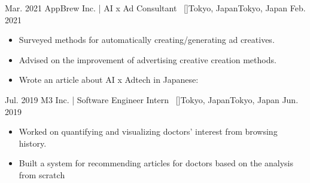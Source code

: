 \begin{experiences}
    \emptySeparator
    \researchexperience
    {Mar. 2021}   {AppBrew Inc. | AI x Ad Consultant{\normalfont  ~ [\href{https://appbrew.io/}{\small{\websiteSymbol}}]}}{Tokyo, Japan}{Tokyo, Japan}
    {Feb. 2021} {
    \begin{itemize}
        \item Surveyed methods for automatically creating/generating ad creatives.
        \item Advised on the improvement of advertising creative creation methods.
        \item Wrote an article about AI x Adtech in Japanese:
    \end{itemize}
    }


    \emptySeparator
    \researchexperience
    {Jul. 2019}   {M3 Inc. | Software Engineer Intern{\normalfont  ~ [\href{https://corporate.m3.com/en/}{\small{\websiteSymbol}}]}}{Tokyo, Japan}{Tokyo, Japan}
    {Jun. 2019} {
    \begin{itemize}
        \item Worked on quantifying and visualizing doctors' interest from browsing history.
        \item Built a system for recommending articles for doctors based on the analysis from scratch
    \end{itemize}
    }



\end{experiences}

